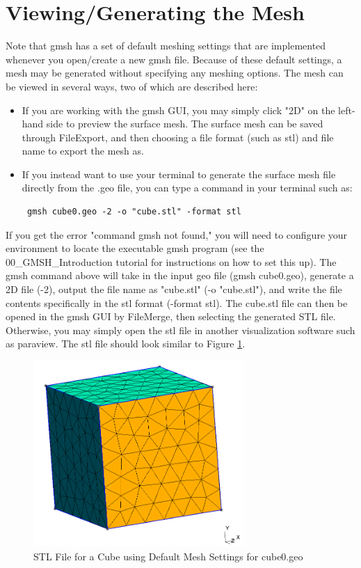 \documentclass{report}
\begin{document}
\section{Viewing/Generating the Mesh}
Note that gmsh has a set of default meshing settings that are implemented whenever you open/create a new gmsh file. Because of these default settings, a mesh may be generated without specifying any meshing options. The mesh can be viewed in several ways, two of which are described here:
\begin{itemize}
\item If you are working with the gmsh GUI, you may simply click "2D" on the left-hand side to preview the surface mesh. The surface mesh can be saved through File\textrightarrow Export, and then choosing a file format (such as stl) and file name to export the mesh as.
\item If you instead want to use your terminal to generate the surface mesh file directly from the .geo file, you can type a command in your terminal such as: \begin{verbatim} gmsh cube0.geo -2 -o "cube.stl" -format stl \end{verbatim} 
\end{itemize}
If you get the error "command gmsh not found," you will need to configure your environment to locate the executable gmsh program (see the 00\_GMSH\_Introduction tutorial for instructions on how to set this up). The gmsh command above will take in the input geo file (gmsh cube0.geo), generate a 2D file (-2),  output the file name as "cube.stl" (-o "cube.stl"), and write the file contents specifically in the stl format (-format stl). The cube.stl file can then be opened in the gmsh GUI by File\textrightarrow Merge, then selecting the generated STL file. Otherwise, you may simply open the stl file in another visualization software such as paraview. The stl file should look similar to Figure \ref{Cube_defMesh}.

\begin{figure}[h]
  \centering
  \includegraphics[width=8cm]{cube0_defaultMesh.png}
  \setcaptionwidth{10cm}
  \caption{STL File for a Cube using Default Mesh Settings for cube0.geo}
  \label{Cube_defMesh}
\end{figure}
 \newpage
\end{document}
